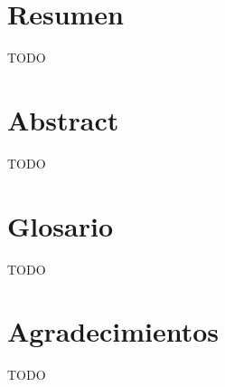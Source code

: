 \section*{Resumen}

TODO

\clearpage

\section*{Abstract}

TODO

\clearpage

\section*{Glosario}

TODO

\clearpage

\section*{Agradecimientos}

TODO
